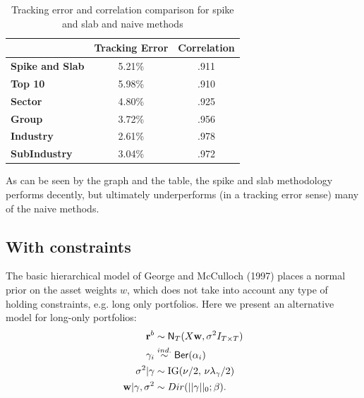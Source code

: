\documentclass[a4paper, 12pt]{article}
\theoremstyle{plain}
\theoremstyle{definition}
\theoremstyle{remark}
\newcommand{\ber}{{\sf Ber}}
\newcommand{\nm}{{\sf N}}
\begin{document}
\begin{table}[H]
\caption{Tracking error and correlation comparison for spike and slab and naive methods}
\centering
\begin{center}
\begin{tabular}{lcc}
\toprule
                        & \multicolumn{1}{r}{\textbf{Tracking Error}} & \multicolumn{1}{r}{\textbf{Correlation}} \\
\midrule
\textbf{Spike and Slab} & 5.21\%                                      & .911                                     \\
\textbf{Top 10}         & 5.98\%                                      & .910                                     \\
\textbf{Sector}         & 4.80\%                                      & .925                                     \\
\textbf{Group}          & 3.72\%                                      & .956                                     \\
\textbf{Industry}       & 2.61\%                                      & .978                                     \\
\textbf{SubIndustry}    & 3.04\%                                      & .972                                    \\
\bottomrule
\end{tabular}
\end{center}
\end{table}

As can be seen by the graph and the table, the spike and slab methodology performs decently, but ultimately underperforms (in a tracking error sense) many of the naive methods.

\subsection{With constraints}
The basic hierarchical model of George and McCulloch (1997) places a normal prior on the asset weights $w$, which does not take into account any type of holding constraints, e.g. long only portfolios.  Here we present an alternative model for long-only portfolios:
\begin{align}
\textbf{r}^b &\sim \nm_{T}(X\textbf{w}, \sigma^2I_{T\times T})\\
\gamma_i &\stackrel{ind.}{\sim} \ber(\alpha_i) \\
\sigma^2 | \gamma & \sim \text{IG}(\nu/2,\,\nu\lambda_\gamma/2)\\
\textbf{w}|\gamma, \sigma^2 & \sim Dir(||\gamma||_0; \beta).
\end{align}
\end{document}
